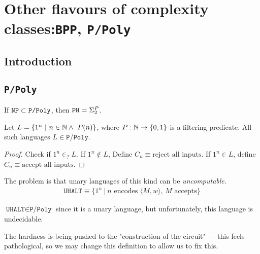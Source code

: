 \newcommand{\ppoly}{\texttt{P/Poly}}
\newcommand{\bpp}{\texttt{BPP}}
\chapter{Other flavours of complexity classes:\bpp, \ppoly}

\section{Introduction}
\section{\ppoly}
If $\nptime \subset \ppoly$, then $\texttt{PH} = \Sigma_2^P$.

\begin{theorem}
    Let $L = \{ 1^n ~\vert~ n \in \mathbb{N} \land ~P(n) \}$, where $P: \mathbb{N} \to \{0, 1\}$
    is a filtering predicate. All such languages $L \in \ppoly$.
\end{theorem}
\begin{proof}
    Check if $1^n \in_? L$. If $1^n \notin L$, Define $C_n \equiv \text{reject all inputs}$.
    If $1^n \in L$, define $C_n \equiv \text{accept all inputs}$.
\end{proof}

The problem is that unary languages of this kind can be \textit{uncomputable}.
\begin{align*}
    \texttt{UHALT} \equiv \{ 1^n~\vert~ \text{$n$ encodes $\langle M, w \rangle$, $M$ accepts} \}
\end{align*}

$\texttt{UHALT} \in \ppoly$ since it is a unary language, but unfortunately, this
language is undecidable.

The hardness is being pushed to the "construction of the circuit" --- this
feels pathological, so we may change this definition to allow us to
fix this.

